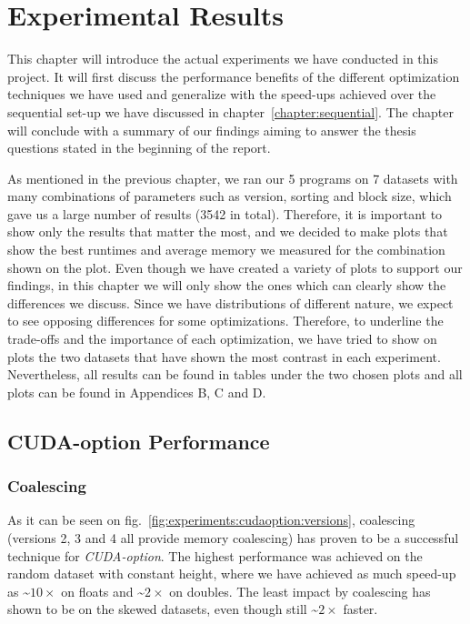 \chapter{Experimental Results}
\label{chapter:experimentalresults}
This chapter will introduce the actual experiments we have conducted in this project. It will first discuss the performance benefits of the different optimization techniques we have used and generalize with the speed-ups achieved over the sequential set-up we have discussed in chapter~\ref{chapter:sequential}. The chapter will conclude with a summary of our findings aiming to answer the thesis questions stated in the beginning of the report. 

As mentioned in the previous chapter, we ran our 5 programs on 7 datasets with many combinations of parameters such as version, sorting and block size, which gave us a large number of results (3542 in total). Therefore, it is important to show only the results that matter the most, and we decided to make plots that show the best runtimes and average memory we measured for the combination shown on the plot.
Even though we have created a variety of plots to support our findings, in this chapter we will only show the ones which can clearly show the differences we discuss. Since we have distributions of different nature, we expect to see opposing differences for some optimizations. Therefore, to underline the trade-offs and the importance of each optimization, we have tried to show on plots the two datasets that have shown the most contrast in each experiment. Nevertheless, all results can be found in tables under the two chosen plots and all plots can be found in Appendices B, C and D.

\section{CUDA-option Performance}
\subsection{Coalescing}
As it can be seen on fig.~\ref{fig:experiments:cudaoption:versions}, coalescing (versions 2, 3 and 4 all provide memory coalescing) has proven to be a successful technique for \textit{CUDA-option}. The highest performance was achieved on the random dataset with constant height, where we have achieved as much speed-up as \textasciitilde$10\times$ on floats and \textasciitilde$2\times$ on doubles. The least impact by coalescing has shown to be on the skewed datasets, even though still \textasciitilde$2\times$ faster. 

